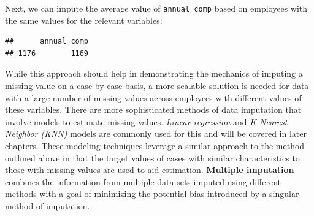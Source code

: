 \documentclass[
]{book}
\newenvironment{Shaded}{\begin{snugshade}}{\end{snugshade}}
\newcommand{\AttributeTok}[1]{\textcolor[rgb]{0.77,0.63,0.00}{#1}}
\newcommand{\CommentTok}[1]{\textcolor[rgb]{0.56,0.35,0.01}{\textit{#1}}}
\newcommand{\ConstantTok}[1]{\textcolor[rgb]{0.00,0.00,0.00}{#1}}
\newcommand{\DecValTok}[1]{\textcolor[rgb]{0.00,0.00,0.81}{#1}}
\newcommand{\FunctionTok}[1]{\textcolor[rgb]{0.00,0.00,0.00}{#1}}
\newcommand{\NormalTok}[1]{#1}
\newcommand{\OtherTok}[1]{\textcolor[rgb]{0.56,0.35,0.01}{#1}}
\newcommand{\SpecialCharTok}[1]{\textcolor[rgb]{0.00,0.00,0.00}{#1}}
\newcommand{\StringTok}[1]{\textcolor[rgb]{0.31,0.60,0.02}{#1}}
\begin{document}
Next, we can impute the average value of \texttt{annual\_comp} based on employees with the same values for the relevant variables:

\begin{Shaded}
\end{Shaded}

\begin{verbatim}
##      annual_comp
## 1176        1169
\end{verbatim}

While this approach should help in demonstrating the mechanics of imputing a missing value on a case-by-case basis, a more scalable solution is needed for data with a large number of missing values across employees with different values of these variables. There are more sophisticated methods of data imputation that involve models to estimate missing values. \emph{Linear regression} and \emph{K-Nearest Neighbor (KNN)} models are commonly used for this and will be covered in later chapters. These modeling techniques leverage a similar approach to the method outlined above in that the target values of cases with similar characteristics to those with missing values are used to aid estimation. \textbf{Multiple imputation} combines the information from multiple data sets imputed using different methods with a goal of minimizing the potential bias introduced by a singular method of imputation.
\end{document}

